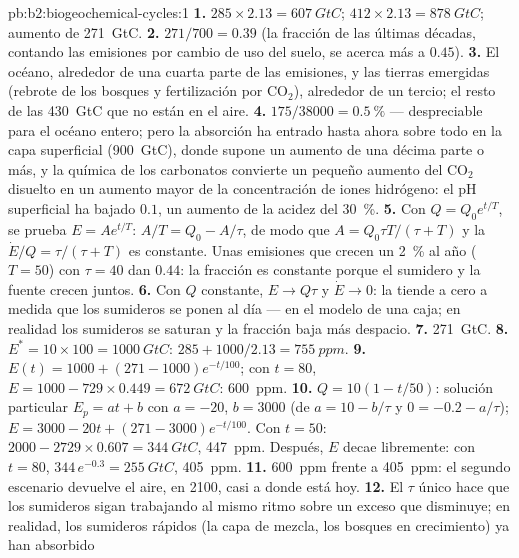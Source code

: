 \begin{solution}{pb:b2:biogeochemical-cycles:1}
\textbf{1.} $285\times 2.13 = \qty{607}{GtC}$; $412\times 2.13 =
\qty{878}{GtC}$; aumento de \qty{271}{GtC}.
\textbf{2.} $271/700 = 0.39$ (la fracción de las últimas décadas, contando
las emisiones por cambio de uso del suelo, se acerca más a $0.45$).
\textbf{3.} El océano, alrededor de una cuarta parte de las emisiones, y
las tierras emergidas (rebrote de los bosques y fertilización por
$\mathrm{CO_2}$), alrededor de un tercio; el resto de las
\qty{430}{GtC} que no están en el aire.
\textbf{4.} $175/38000 = \qty{0.5}{\%}$ --- despreciable para el océano
entero; pero la absorción ha entrado hasta ahora sobre todo en la capa
superficial (\qty{900}{GtC}), donde supone un aumento de una décima parte o
más, y la química de los carbonatos convierte un pequeño aumento del
$\mathrm{CO_2}$ disuelto en un aumento mayor de la concentración de iones
hidrógeno: el pH superficial ha bajado
$0.1$, un aumento de la acidez del \qty{30}{\%}.
\textbf{5.} Con $Q = Q_0 e^{t/T}$, se prueba $E = Ae^{t/T}$: $A/T = Q_0 -
A/\tau$, de modo que $A = Q_0\tau T/(\tau + T)$ y la 
$\dot E/Q = \tau/(\tau + T)$ es constante. Unas emisiones que crecen un
\qty{2}{\%} al año ($T = 50$) con $\tau = 40$ dan $0.44$: la fracción es
constante porque el sumidero y la fuente crecen juntos.
\textbf{6.} Con $Q$ constante, $E \to Q\tau$ y $\dot E \to 0$: la
 tiende a cero a medida que los sumideros se ponen al
día --- en el modelo de una caja; en realidad los sumideros se saturan y la
fracción baja más despacio.
\textbf{7.} \qty{271}{GtC}.
\textbf{8.} $E^{*} = 10\times 100 = \qty{1000}{GtC}$: $285 +
1000/2.13 = \qty{755}{ppm}$.
\textbf{9.} $E(t) = 1000 + (271 - 1000)e^{-t/100}$; con $t = 80$,
$E = 1000 - 729\times 0.449 = \qty{672}{GtC}$: \qty{600}{ppm}.
\textbf{10.} $Q = 10(1 - t/50)$: solución particular $E_p = at + b$
con $a = -20$, $b = 3000$ (de $a = 10 - b/\tau$ y $0 = -0.2 -
a/\tau$); $E = 3000 - 20t + (271 - 3000)e^{-t/100}$. Con $t = 50$:
$2000 - 2729\times 0.607 = \qty{344}{GtC}$, \qty{447}{ppm}. Después, $E$
decae libremente: con $t = 80$, $344\,e^{-0.3} = \qty{255}{GtC}$,
\qty{405}{ppm}.
\textbf{11.} \qty{600}{ppm} frente a \qty{405}{ppm}: el segundo escenario
devuelve el aire, en 2100, casi a donde está hoy.
\textbf{12.} El $\tau$ único hace que los sumideros sigan trabajando al
mismo ritmo sobre un exceso que disminuye; en realidad, los sumideros
rápidos (la capa de mezcla, los bosques en crecimiento) ya han absorbido

\end{solution}
